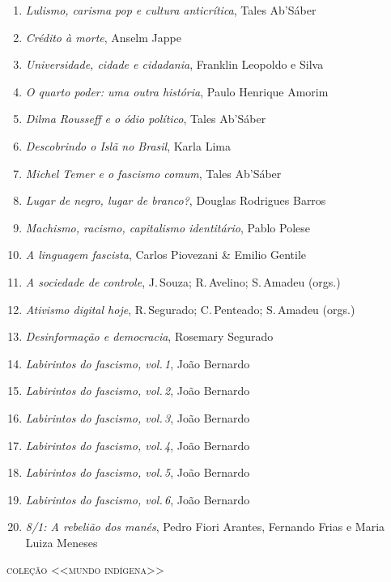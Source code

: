 \begin{enumerate}
\setlength\parskip{4.2pt}
\setlength\itemsep{-1.4mm}
\item \textit{Lulismo, carisma pop e cultura anticrítica}, Tales Ab'Sáber
\item \textit{Crédito à morte}, Anselm Jappe
\item \textit{Universidade, cidade e cidadania}, Franklin Leopoldo e Silva
\item \textit{O quarto poder: uma outra história}, Paulo Henrique Amorim
\item \textit{Dilma Rousseff e o ódio político}, Tales Ab'Sáber
\item \textit{Descobrindo o Islã no Brasil}, Karla Lima
\item \textit{Michel Temer e o fascismo comum}, Tales Ab'Sáber
\item \textit{Lugar de negro, lugar de branco?}, Douglas Rodrigues Barros
\item \textit{Machismo, racismo, capitalismo identitário}, Pablo Polese
\item \textit{A linguagem fascista}, Carlos Piovezani \& Emilio Gentile
\item \textit{A sociedade de controle}, J.\,Souza; R.\,Avelino; S.\,Amadeu (orgs.)
\item \textit{Ativismo digital hoje}, R.\,Segurado; C.\,Penteado; S.\,Amadeu (orgs.)
\item \textit{Desinformação e democracia}, Rosemary Segurado
\item \textit{Labirintos do fascismo, vol.\,1}, João Bernardo
\item \textit{Labirintos do fascismo, vol.\,2}, João Bernardo
\item \textit{Labirintos do fascismo, vol.\,3}, João Bernardo
\item \textit{Labirintos do fascismo, vol.\,4}, João Bernardo
\item \textit{Labirintos do fascismo, vol.\,5}, João Bernardo
\item \textit{Labirintos do fascismo, vol.\,6}, João Bernardo
\item \textit{8/1: A rebelião dos manés}, Pedro Fiori Arantes, Fernando Frias e Maria Luiza Meneses
\end{enumerate}

\medskip
{\large\textsc{coleção <<mundo indígena>>}}


